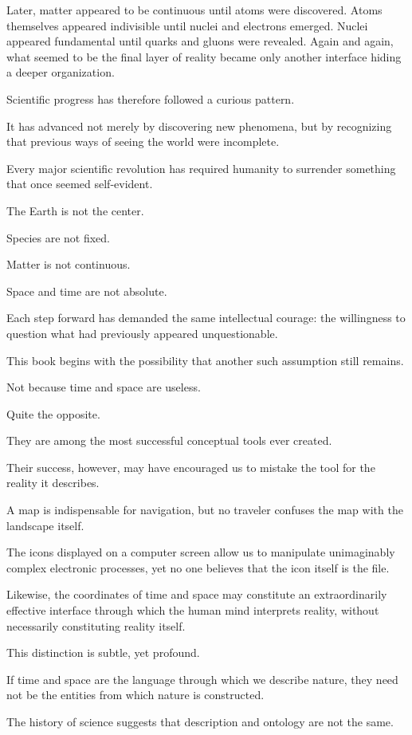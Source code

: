Later, matter appeared to be continuous until atoms were discovered. Atoms themselves appeared indivisible until nuclei and electrons emerged. Nuclei appeared fundamental until quarks and gluons were revealed. Again and again, what seemed to be the final layer of reality became only another interface hiding a deeper organization.

Scientific progress has therefore followed a curious pattern.

It has advanced not merely by discovering new phenomena, but by recognizing that previous ways of seeing the world were incomplete.

Every major scientific revolution has required humanity to surrender something that once seemed self-evident.

The Earth is not the center.

Species are not fixed.

Matter is not continuous.

Space and time are not absolute.

Each step forward has demanded the same intellectual courage: the willingness to question what had previously appeared unquestionable.

This book begins with the possibility that another such assumption still remains.

Not because time and space are useless.

Quite the opposite.

They are among the most successful conceptual tools ever created.

Their success, however, may have encouraged us to mistake the tool for the reality it describes.

A map is indispensable for navigation, but no traveler confuses the map with the landscape itself.

The icons displayed on a computer screen allow us to manipulate unimaginably complex electronic processes, yet no one believes that the icon itself is the file.

Likewise, the coordinates of time and space may constitute an extraordinarily effective interface through which the human mind interprets reality, without necessarily constituting reality itself.

This distinction is subtle, yet profound.

If time and space are the language through which we describe nature, they need not be the entities from which nature is constructed.

The history of science suggests that description and ontology are not the same.

